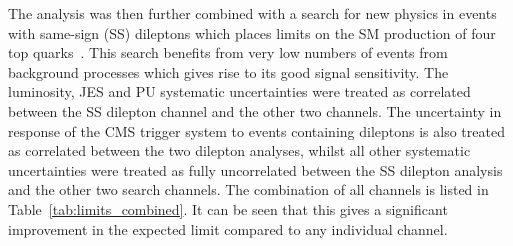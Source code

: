 The analysis was then further combined with a search for new physics in events with same-sign (SS) dileptons which places limits on the SM production of four top quarks~\cite{Khachatryan:2016kod}. This search benefits from very low numbers of events from background processes which gives rise to its good signal sensitivity. The luminosity, JES and PU systematic uncertainties were treated as correlated between the SS dilepton channel and the other two channels. The uncertainty in response of the CMS trigger system to events containing dileptons is also treated as correlated between the two dilepton analyses, whilst all other systematic uncertainties were treated as fully uncorrelated between the SS dilepton analysis and the other two search channels. The combination of all channels is listed in Table~\ref{tab:limits_combined}. It can be seen that this gives a significant improvement in the expected limit compared to any individual channel.

\clearpage


